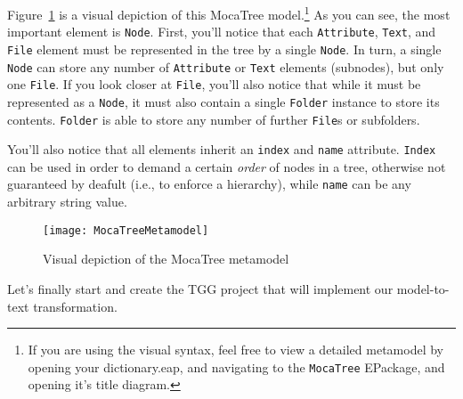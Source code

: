 Figure~\ref{mocaTreeMetamodel} is a visual depiction of this MocaTree model.\footnote{If you are using the visual syntax, feel free to view a detailed metamodel
by opening your dictionary.eap, and navigating to the \texttt{MocaTree} EPackage, and opening it's title diagram.} As you can see, the most important element is
\texttt{Node}. First, you'll notice that each \texttt{Attribute}, \texttt{Text}, and \texttt{File} element must be represented in the tree by a single
\texttt{Node}. In turn, a single \texttt{Node} can store any number of \texttt{Attribute} or \texttt{Text} elements (subnodes), but only one \texttt{File}. If
you look closer at \texttt{File}, you'll also notice that while it must be represented as a \texttt{Node}, it must also contain a single \texttt{Folder}
instance to store its contents. \texttt{Folder} is able to store any number of further \texttt{File}s or subfolders.

\newpage

You'll also notice that all elements inherit an \texttt{index} and \texttt{name} attribute. \texttt{Index} can be used in order to demand a certain \emph{order}
of nodes in a tree, otherwise not guaranteed by deafult (i.e., to enforce a hierarchy), while \texttt{name} can be any arbitrary string value. 

\vspace{0.5cm}

\begin{figure}[htbp]
  \hspace{-3cm}
  \texttt{[image: MocaTreeMetamodel]}
  \caption{Visual depiction of the MocaTree metamodel}
  \label{mocaTreeMetamodel}
\end{figure}

\vspace{0.5cm}

Let's finally start and create the TGG project that will implement our model-to-text transformation.


\newpage






